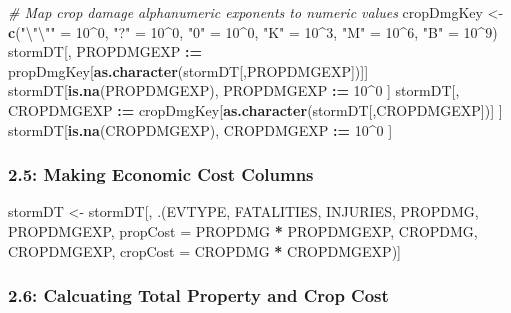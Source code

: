 \documentclass[]{article}
\newenvironment{Shaded}{\begin{snugshade}}{\end{snugshade}}
\newcommand{\KeywordTok}[1]{\textcolor[rgb]{0.13,0.29,0.53}{\textbf{#1}}}
\newcommand{\DataTypeTok}[1]{\textcolor[rgb]{0.13,0.29,0.53}{#1}}
\newcommand{\DecValTok}[1]{\textcolor[rgb]{0.00,0.00,0.81}{#1}}
\newcommand{\CharTok}[1]{\textcolor[rgb]{0.31,0.60,0.02}{#1}}
\newcommand{\StringTok}[1]{\textcolor[rgb]{0.31,0.60,0.02}{#1}}
\newcommand{\CommentTok}[1]{\textcolor[rgb]{0.56,0.35,0.01}{\textit{#1}}}
\newcommand{\OperatorTok}[1]{\textcolor[rgb]{0.81,0.36,0.00}{\textbf{#1}}}
\newcommand{\ErrorTok}[1]{\textcolor[rgb]{0.64,0.00,0.00}{\textbf{#1}}}
\newcommand{\NormalTok}[1]{#1}
\begin{document}
\begin{Shaded}
\begin{Highlighting}[]
\CommentTok{# Map crop damage alphanumeric exponents to numeric values}
\NormalTok{cropDmgKey <-}\StringTok{  }\KeywordTok{c}\NormalTok{(}\StringTok{"}\CharTok{\textbackslash{}"\textbackslash{}"}\StringTok{"}\NormalTok{ =}\StringTok{ }\DecValTok{10}\OperatorTok{^}\DecValTok{0}\NormalTok{,}
                \StringTok{"?"}\NormalTok{ =}\StringTok{ }\DecValTok{10}\OperatorTok{^}\DecValTok{0}\NormalTok{, }
                \StringTok{"0"}\NormalTok{ =}\StringTok{ }\DecValTok{10}\OperatorTok{^}\DecValTok{0}\NormalTok{,}
                \StringTok{"K"}\NormalTok{ =}\StringTok{ }\DecValTok{10}\OperatorTok{^}\DecValTok{3}\NormalTok{,}
                \StringTok{"M"}\NormalTok{ =}\StringTok{ }\DecValTok{10}\OperatorTok{^}\DecValTok{6}\NormalTok{,}
                \StringTok{"B"}\NormalTok{ =}\StringTok{ }\DecValTok{10}\OperatorTok{^}\DecValTok{9}\NormalTok{)}
\NormalTok{stormDT[, PROPDMGEXP }\OperatorTok{:}\ErrorTok{=}\StringTok{ }\NormalTok{propDmgKey[}\KeywordTok{as.character}\NormalTok{(stormDT[,PROPDMGEXP])]]}
\NormalTok{stormDT[}\KeywordTok{is.na}\NormalTok{(PROPDMGEXP), PROPDMGEXP }\OperatorTok{:}\ErrorTok{=}\StringTok{ }\DecValTok{10}\OperatorTok{^}\DecValTok{0}\NormalTok{ ]}
\NormalTok{stormDT[, CROPDMGEXP }\OperatorTok{:}\ErrorTok{=}\StringTok{ }\NormalTok{cropDmgKey[}\KeywordTok{as.character}\NormalTok{(stormDT[,CROPDMGEXP])] ]}
\NormalTok{stormDT[}\KeywordTok{is.na}\NormalTok{(CROPDMGEXP), CROPDMGEXP }\OperatorTok{:}\ErrorTok{=}\StringTok{ }\DecValTok{10}\OperatorTok{^}\DecValTok{0}\NormalTok{ ]}
\end{Highlighting}
\end{Shaded}

\subsubsection{2.5: Making Economic Cost
Columns}\label{making-economic-cost-columns}

\begin{Shaded}
\begin{Highlighting}[]
\NormalTok{stormDT <-}\StringTok{ }\NormalTok{stormDT[, .(EVTYPE, FATALITIES, INJURIES, PROPDMG, PROPDMGEXP, }\DataTypeTok{propCost =}\NormalTok{ PROPDMG }\OperatorTok{*}\StringTok{ }\NormalTok{PROPDMGEXP, CROPDMG, CROPDMGEXP, }\DataTypeTok{cropCost =}\NormalTok{ CROPDMG }\OperatorTok{*}\StringTok{ }\NormalTok{CROPDMGEXP)]}
\end{Highlighting}
\end{Shaded}

\subsubsection{2.6: Calcuating Total Property and Crop
Cost}\label{calcuating-total-property-and-crop-cost}
\end{document}
